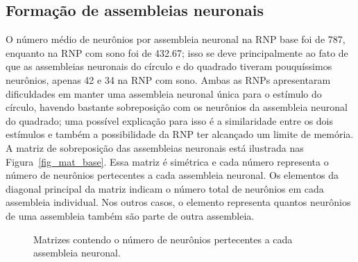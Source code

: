 \subsection{Formação de assembleias neuronais}

O número médio de neurônios por assembleia neuronal na RNP base foi de 787, enquanto na RNP com sono foi de 432.67; isso se deve
principalmente ao fato de que as assembleias neuronais do círculo e do quadrado tiveram pouquíssimos neurônios, apenas 42 e 34 na
RNP com sono. Ambas as RNPs apresentaram dificuldades em manter uma assembleia neuronal única para o estímulo do círculo, havendo
bastante sobreposição com os neurônios da assembleia neuronal do quadrado; uma possível explicação para isso é a similaridade
entre os dois estímulos e também a possibilidade da RNP ter alcançado um limite de memória. A matriz de sobreposição das
assembleias neuronais está ilustrada nas Figura~\ref{fig_mat_base}. Essa matriz é simétrica e cada número representa o número de
neurônios pertecentes a cada assembleia neuronal. Os elementos da diagonal principal da matriz indicam o número total de neurônios
em cada assembleia individual. Nos outros casos, o elemento representa quantos neurônios de uma assembleia também são parte de
outra assembleia.

\begin{figure}[!ht]
\caption{Matrizes contendo o número de neurônios pertecentes a cada assembleia neuronal.}
\end{figure}

